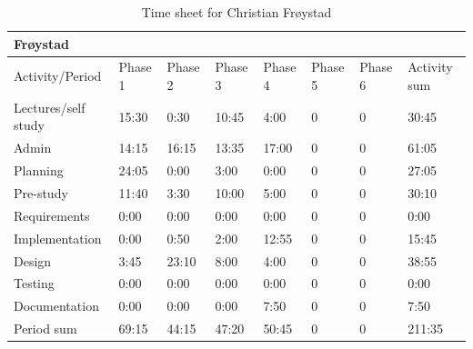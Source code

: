 \documentclass[11pt]{book}
\begin{document}
\begin{table}[H]
\centering
\begin{tabular}{| l | l | l | l | l | l | l | l |}
    \hline
    Frøystad            &          &          &          &          &             &             &              \\ \hline            
    Activity/Period     & Phase 1  & Phase 2  & Phase  3 & Phase 4  & Phase 5     & Phase 6     & Activity sum \\ \hline
    Lectures/self study & 15:30    & 0:30     & 10:45    & 4:00     & 0           & 0           & 30:45        \\ \hline
    Admin               & 14:15    & 16:15    & 13:35    & 17:00    & 0           & 0           & 61:05        \\ \hline
    Planning            & 24:05    & 0:00     & 3:00     & 0:00     & 0           & 0           & 27:05        \\ \hline
    Pre-study           & 11:40    & 3:30     & 10:00    & 5:00     & 0           & 0           & 30:10        \\ \hline
    Requirements        & 0:00     & 0:00     & 0:00     & 0:00     & 0           & 0           & 0:00         \\ \hline
    Implementation      & 0:00     & 0:50     & 2:00     & 12:55    & 0           & 0           & 15:45        \\ \hline
    Design              & 3:45     & 23:10    & 8:00     & 4:00     & 0           & 0           & 38:55        \\ \hline
    Testing             & 0:00     & 0:00     & 0:00     & 0:00     & 0           & 0           & 0:00         \\ \hline
    Documentation       & 0:00     & 0:00     & 0:00     & 7:50     & 0           & 0           & 7:50         \\ \hline
    Period sum          & 69:15    & 44:15    & 47:20    & 50:45    & 0           & 0           & 211:35       \\ \hline
\end{tabular}
\caption{Time sheet for Christian Frøystad}
\label{tab:appendix_timesheets_christian}
\end{table}
\end{document}
